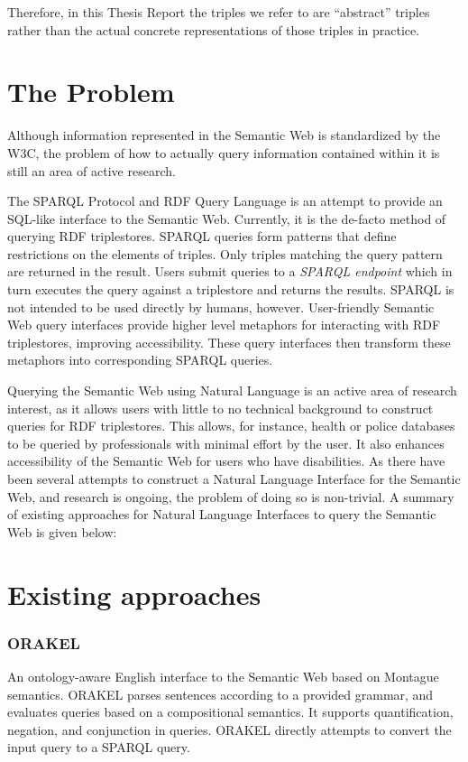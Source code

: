 \documentclass[../main.tex]{subfiles}
\begin{document}
Therefore, in this Thesis Report the triples we refer to are ``abstract'' triples rather than the actual concrete representations of those triples in practice.


\section {The Problem}

Although information represented in the Semantic Web is standardized by the W3C\cite{w3csemanticweb}, the problem of how to actually query information contained within it is still an area of active research.

The SPARQL Protocol and RDF Query Language is an attempt to provide an SQL-like interface to the Semantic Web.  Currently, it is the de-facto method of querying RDF triplestores.  SPARQL queries form patterns that define restrictions on the elements of triples.  Only triples matching the query pattern are returned in the result.  Users submit queries to a {\em SPARQL endpoint} which in turn executes the query against a triplestore and returns the results.  SPARQL is not intended to be used directly by humans, however. User-friendly Semantic Web query interfaces provide higher level metaphors for interacting with RDF triplestores, improving accessibility.  These query interfaces then transform these metaphors into corresponding SPARQL queries.

Querying the Semantic Web using Natural Language is an active area of research interest, as it allows users with little to no technical background to construct queries for RDF triplestores.  This allows, for instance, health or police databases to be queried by professionals with minimal effort by the user.  It also enhances accessibility of the Semantic Web for users who have disabilities.  As there have been several attempts to construct a Natural Language Interface for the Semantic Web, and research is ongoing, the problem of doing so is non-trivial.  A summary of existing approaches for Natural Language Interfaces to query the Semantic Web is given below:


\section {Existing approaches}

\subsubsection{ORAKEL}
An ontology-aware English interface to the Semantic Web based on Montague semantics\cite{cimiano2007orakel}.  ORAKEL parses sentences according to a provided grammar,
and evaluates queries based on a compositional semantics.  It supports quantification, negation, and conjunction in queries.  ORAKEL directly attempts to convert the input query to a SPARQL query.
\end{document}
